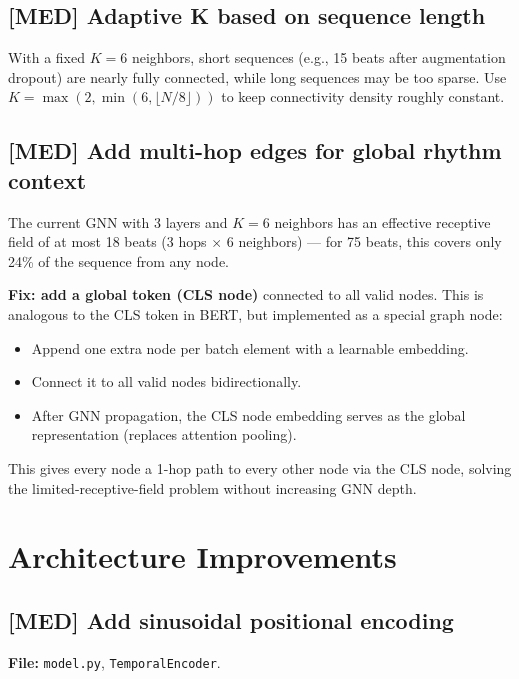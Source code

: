 \documentclass[11pt,a4paper]{article}
\newcommand{\med}[1]{\textcolor{impactmed}{\textbf{[MED]} #1}}
\newcommand{\file}[1]{\texttt{#1}}
\begin{document}
\subsection{\med{Adaptive K based on sequence length}}

With a fixed $K=6$ neighbors, short sequences (e.g., 15 beats after augmentation dropout)
are nearly fully connected, while long sequences may be too sparse.
Use $K = \max(2, \min(6, \lfloor N/8 \rfloor))$ to keep connectivity density roughly constant.

\subsection{\med{Add multi-hop edges for global rhythm context}}

The current GNN with 3 layers and $K=6$ neighbors has an effective receptive field
of at most 18 beats (3 hops $\times$ 6 neighbors) --- for 75 beats, this covers
only 24\% of the sequence from any node.

\textbf{Fix: add a global token (CLS node)} connected to all valid nodes.
This is analogous to the CLS token in BERT, but implemented as a special graph node:
\begin{itemize}[leftmargin=*]
    \item Append one extra node per batch element with a learnable embedding.
    \item Connect it to all valid nodes bidirectionally.
    \item After GNN propagation, the CLS node embedding serves as the global representation
          (replaces attention pooling).
\end{itemize}
This gives every node a 1-hop path to every other node via the CLS node,
solving the limited-receptive-field problem without increasing GNN depth.

\section{Architecture Improvements}

\subsection{\med{Add sinusoidal positional encoding}}

\textbf{File:} \file{model.py}, \texttt{TemporalEncoder}.
\end{document}
